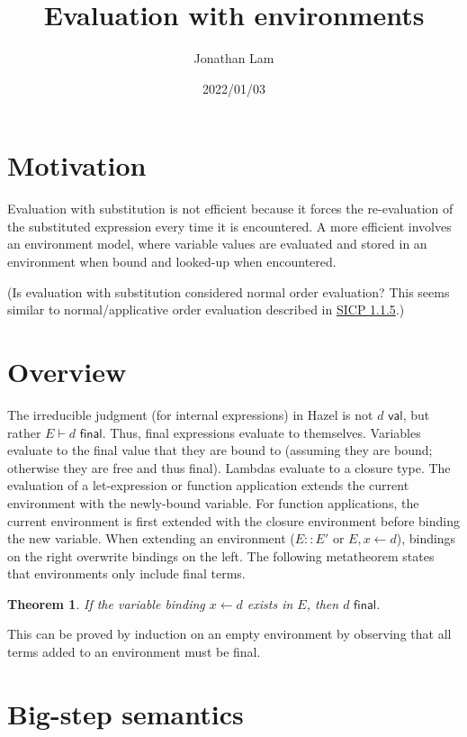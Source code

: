 \documentclass{article}
\title{Evaluation with environments}
\author{Jonathan Lam}
\date{2022/01/03}
\newtheorem{theorem}{Theorem}
\begin{document}
\maketitle{}

\section{Motivation}

Evaluation with substitution is not efficient because it forces the re-evaluation of the substituted expression every time it is encountered. A more efficient involves an environment model, where variable values are evaluated and stored in an environment when bound and looked-up when encountered.

(Is evaluation with substitution considered normal order evaluation? This seems similar to normal/applicative order evaluation described in \href{https://mitpress.mit.edu/sites/default/files/sicp/full-text/book/book-Z-H-10.html#%_sec_1.1.5}{SICP 1.1.5}.)

\section{Overview}

The irreducible judgment (for internal expressions) in Hazel is not $d\textsf{ val}$, but rather $E\vdash d\textsf{ final}$. Thus, final expressions evaluate to themselves. Variables evaluate to the final value that they are bound to (assuming they are bound; otherwise they are free and thus final). Lambdas evaluate to a closure type. The evaluation of a let-expression or function application extends the current environment with the newly-bound variable. For function applications, the current environment is first extended with the closure environment before binding the new variable. When extending an environment ($E::E'$ or $E,x\leftarrow d$), bindings on the right overwrite bindings on the left. The following metatheorem states that environments only include final terms.
\begin{theorem}
  If the variable binding $x\leftarrow d$ exists in $E$, then $d\textsf{ final}$.
\end{theorem}
This can be proved by induction on an empty environment by observing that all terms added to an environment must be final.

\clearpage{}
\section*{Big-step semantics}
\end{document}
